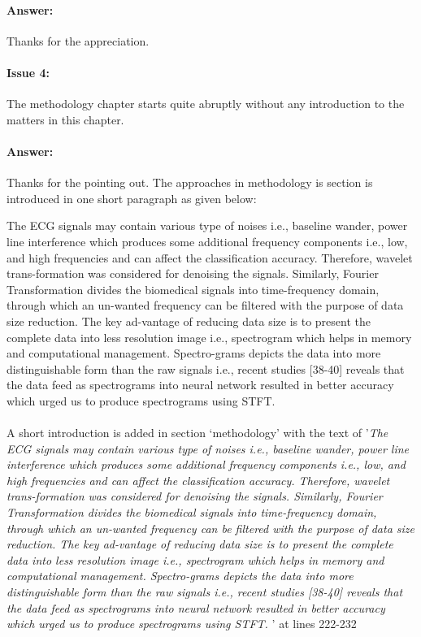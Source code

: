 \documentclass{article}
\begin{document}
\paragraph{Answer:}
Thanks for the appreciation.

\paragraph{Issue 4:}
\begin{displayquote}
The methodology chapter starts quite abruptly without any introduction to the matters in this chapter.
\end{displayquote}

\paragraph{Answer:}
Thanks for the pointing out. The approaches in methodology is section is introduced in one short paragraph as given below:

The ECG signals may contain various type of noises i.e., baseline wander, power line interference which produces some additional frequency components i.e., low, and high frequencies and can affect the classification accuracy. Therefore, wavelet trans-formation was considered for denoising the signals. Similarly, Fourier Transformation divides the biomedical signals into time-frequency domain, through which an un-wanted frequency can be filtered with the purpose of data size reduction. The key ad-vantage of reducing data size is to present the complete data into less resolution image i.e., spectrogram which helps in memory and computational management. Spectro-grams depicts the data into more distinguishable form than the raw signals i.e., recent studies [38-40] reveals that the data feed as spectrograms into neural network resulted in better accuracy which urged us to produce spectrograms using STFT.  \\\\

A short introduction is added in section `methodology' with the text of '\textit{The ECG signals may contain various type of noises i.e., baseline wander, power line interference which produces some additional frequency components i.e., low, and high frequencies and can affect the classification accuracy. Therefore, wavelet trans-formation was considered for denoising the signals. Similarly, Fourier Transformation divides the biomedical signals into time-frequency domain, through which an un-wanted frequency can be filtered with the purpose of data size reduction. The key ad-vantage of reducing data size is to present the complete data into less resolution image i.e., spectrogram which helps in memory and computational management. Spectro-grams depicts the data into more distinguishable form than the raw signals i.e., recent studies [38-40] reveals that the data feed as spectrograms into neural network resulted in better accuracy which urged us to produce spectrograms using STFT. }' at lines 222-232
\end{document}
